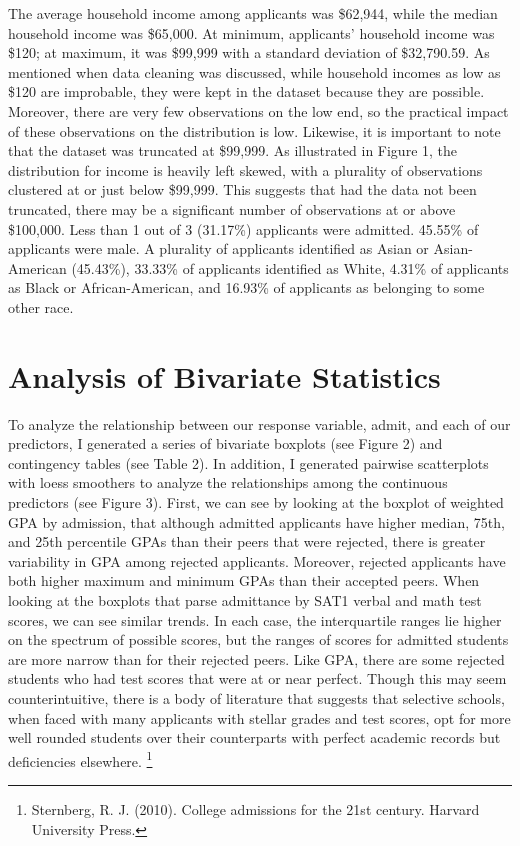 \documentclass[titlepage]{article}   	%
\begin{document}
The average household income among applicants was \$62,944, while the median household income was \$65,000. At minimum, applicants’ household income was \$120; at maximum, it was \$99,999 with a standard deviation of \$32,790.59. As mentioned when data cleaning was discussed, while household incomes as low as \$120 are improbable, they were kept in the dataset because they are possible. Moreover, there are very few observations on the low end, so the practical impact of these observations on the distribution is low. Likewise, it is important to note that the dataset was truncated at \$99,999. As illustrated in Figure 1, the distribution for income is heavily left skewed, with a plurality of observations clustered at or just below \$99,999. This suggests that had the data not been truncated, there may be a significant number of observations at or above \$100,000. Less than 1 out of 3 (31.17\%) applicants were admitted. 45.55\% of applicants were male. A plurality of applicants identified as Asian or Asian-American (45.43\%), 33.33\% of applicants identified as White, 4.31\% of applicants as Black or African-American, and 16.93\% of applicants as belonging to some other race. 

\section{Analysis of Bivariate Statistics}

To analyze the relationship between our response variable, admit, and each of our predictors, I generated a series of bivariate boxplots (see Figure 2) and contingency tables (see Table 2). In addition, I generated pairwise scatterplots with loess smoothers to analyze the relationships among the continuous predictors (see Figure 3). First, we can see by looking at the boxplot of weighted GPA by admission, that although admitted applicants have higher median, 75th, and 25th percentile GPAs than their peers that were rejected, there is greater variability in GPA among rejected applicants. Moreover, rejected applicants have both higher maximum and minimum GPAs than their accepted peers. When looking at the boxplots that parse admittance by SAT1 verbal and math test scores, we can see similar trends. In each case, the interquartile ranges lie higher on the spectrum of possible scores, but the ranges of scores for admitted students are more narrow than for their rejected peers. Like GPA, there are some rejected students who had test scores that were at or near perfect. Though this may seem counterintuitive, there is a body of literature that suggests that selective schools, when faced with many applicants with stellar grades and test scores, opt for more well rounded students over their counterparts with perfect academic records but deficiencies elsewhere. \footnote{\label{myfootnote} Sternberg, R. J. (2010). College admissions for the 21st century. Harvard University Press.} 
\end{document}
